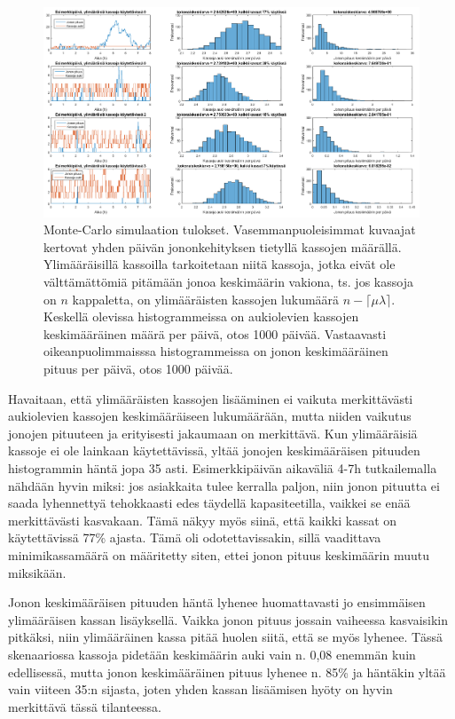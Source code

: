 \documentclass{article}     %
\begin{document}
\begin{figure}
\centering
\includegraphics[width = \textwidth]{simulaatiokuvat}
\caption{Monte-Carlo simulaation tulokset. Vasemmanpuoleisimmat kuvaajat kertovat yhden päivän jononkehityksen tietyllä kassojen määrällä. Ylimääräisillä kassoilla tarkoitetaan niitä kassoja, jotka eivät ole välttämättömiä pitämään jonoa keskimäärin vakiona, ts. jos kassoja on $n$ kappaletta, on ylimääräisten kassojen lukumäärä $n - \lceil \mu\lambda \rceil$. Keskellä olevissa histogrammeissa on aukiolevien kassojen keskimääräinen määrä per päivä, otos 1000 päivää. Vastaavasti oikeanpuolimmaisssa histogrammeissa on jonon keskimääräinen pituus per päivä, otos 1000 päivää.}
\label{fig:montecarlo}
\end{figure}

Havaitaan, että ylimääräisten kassojen lisääminen ei vaikuta merkittävästi aukiolevien kassojen keskimääräiseen lukumäärään, mutta niiden vaikutus jonojen pituuteen ja erityisesti jakaumaan on merkittävä. Kun ylimääräisiä kassoje ei ole lainkaan käytettävissä, yltää jonojen keskimääräisen pituuden histogrammin häntä jopa 35 asti. Esimerkkipäivän aikaväliä 4-7h tutkailemalla nähdään hyvin miksi: jos asiakkaita tulee kerralla paljon, niin jonon pituutta ei saada lyhennettyä tehokkaasti edes täydellä kapasiteetilla, vaikkei se enää merkittävästi kasvakaan. Tämä näkyy myös siinä, että kaikki kassat on käytettävissä 77\% ajasta. Tämä oli odotettavissakin, sillä vaadittava minimikassamäärä on määritetty siten, ettei jonon pituus keskimäärin muutu miksikään.

Jonon keskimääräisen pituuden häntä lyhenee huomattavasti jo ensimmäisen ylimääräisen kassan lisäyksellä. Vaikka jonon pituus jossain vaiheessa kasvaisikin pitkäksi, niin ylimääräinen kassa pitää huolen siitä, että se myös lyhenee. Tässä skenaariossa kassoja pidetään keskimäärin auki vain n. 0,08 enemmän kuin edellisessä, mutta jonon keskimääräinen pituus lyhenee n. 85\% ja häntäkin yltää vain viiteen 35:n sijasta, joten yhden kassan lisäämisen hyöty on hyvin merkittävä tässä tilanteessa.
\end{document}
